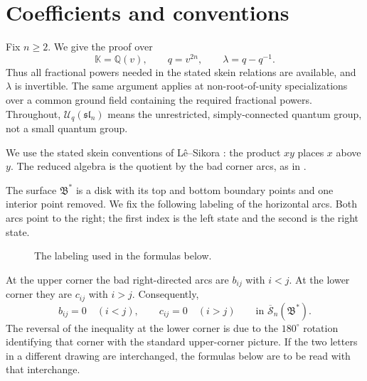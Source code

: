 \documentclass[11pt]{article}
\theoremstyle{remark}
\newcommand{\kk}{\mathbb{K}}
\newcommand{\UU}{\mathcal U_q}
\newcommand{\rSk}{\overline{\mathscr S}_n}
\newcommand{\Bstar}{\mathfrak B^{*}}
\newcommand{\slie}{\mathfrak{sl}_n}
\begin{document}
\section{Coefficients and conventions}

Fix $n\geq 2$.  We give the proof over
\[
  \kk=\mathbb Q(v),\qquad q=v^{2n},\qquad
  \lambda=q-q^{-1}.
\]
Thus all fractional powers needed in the stated skein relations are
available, and $\lambda$ is invertible.  The same argument applies
at non-root-of-unity specializations over a common ground field
containing the required fractional powers.  Throughout,
$\UU(\slie)$ means the unrestricted, simply-connected quantum group,
not a small quantum group.

We use the stated skein conventions of L\^e--Sikora
\cite{LS}: the product $xy$ places $x$ above $y$.
The reduced algebra is the quotient by the bad corner arcs, as in
\cite[Section~7.1]{LY}.

The surface $\Bstar$ is a disk with its top and bottom boundary
points and one interior point removed.  We fix the following
labeling of the horizontal arcs.  Both arcs point to the right;
the first index is the left state and the second is the right state.

\begin{figure}[ht]
\centering
{}
\caption{The labeling used in the formulas below.}
\label{fig:bigon}
\end{figure}

At the upper corner the bad right-directed arcs are $b_{ij}$ with
$i<j$.  At the lower corner they are $c_{ij}$ with $i>j$.
Consequently,
\begin{equation}\label{eq:triangular}
 b_{ij}=0\quad(i<j),\qquad
 c_{ij}=0\quad(i>j)
 \qquad\text{in }\rSk(\Bstar).
\end{equation}
The reversal of the inequality at the lower corner is due to the
$180^\circ$ rotation identifying that corner with the standard
upper-corner picture.  If the two letters in a different drawing
are interchanged, the formulas below are to be read with that
interchange.
\end{document}
